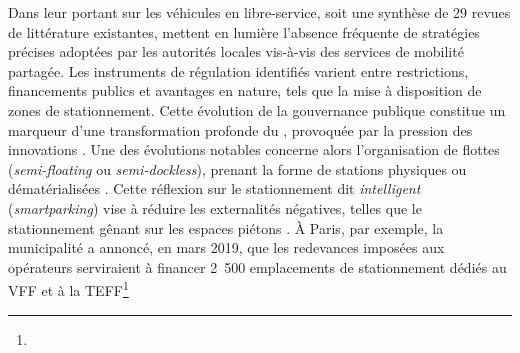\begin{refsegment}
Dans leur  portant sur les véhicules en libre-service, soit une synthèse de 29 revues de littérature existantes, \textcolor{blue}{\textcite[16]{mangeart_vehicules_2022}} mettent en lumière l'absence fréquente de stratégies précises adoptées par les autorités locales vis-à-vis des services de mobilité partagée. Les instruments de régulation identifiés varient entre restrictions, financements publics et avantages en nature, tels que la mise à disposition de zones de stationnement. Cette évolution de la gouvernance publique constitue un marqueur d'une transformation profonde du , provoquée par la pression des innovations \textcolor{blue}{\autocites[319]{canitez_pathways_2019}[4]{fryszman_smart_2019}}. Une des évolutions notables concerne alors l’organisation de flottes  (\textsl{semi-floating} ou \textsl{semi-dockless}), prenant la forme de stations physiques ou dématérialisées \textcolor{blue}{\autocite[121]{6t-bureau_de_recherche_livre_2019}}. Cette réflexion sur le stationnement dit \textsl{intelligent} (\textsl{smartparking}) vise à réduire les externalités négatives, telles que le stationnement gênant sur les espaces piétons \textcolor{blue}{\autocite[13]{zou_exploratory_2020}}. À Paris, par exemple, la municipalité a annoncé, en mars 2019, que les redevances imposées aux opérateurs serviraient à financer 2~500 emplacements de stationnement dédiés au \acrshort{VFF} et à la \acrshort{TEFF}\footnote{
}
\end{refsegment}
